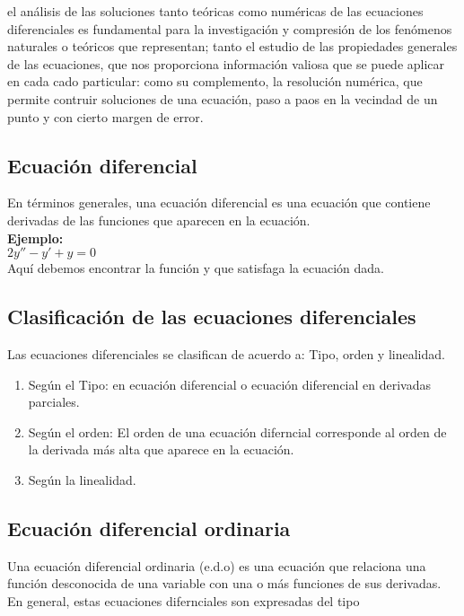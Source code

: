\documentclass{book}
\begin{document}
    el análisis de las soluciones tanto teóricas como numéricas de las ecuaciones
    diferenciales es fundamental para la investigación y compresión de los fenómenos naturales
    o teóricos que representan; tanto el estudio de las propiedades generales de las ecuaciones, que nos 
    proporciona información valiosa que se puede aplicar en cada cado particular: como su complemento, la resolución numérica,
    que permite contruir soluciones de una ecuación, paso a paos en la vecindad de un punto y con cierto margen de error.
    
    \subsection{Ecuación diferencial}
    En términos generales, una ecuación diferencial es una ecuación que 
    contiene derivadas de las funciones que aparecen en la ecuación.
    \\
    \textbf{Ejemplo:}
    \\
    $2y''-y'+y=0$
    \\ 
    Aquí debemos encontrar la función y que satisfaga la ecuación dada.
    
    \subsection{Clasificación de las ecuaciones diferenciales}
    Las ecuaciones diferenciales se clasifican de acuerdo a:
    Tipo, orden y linealidad.
    
    \begin{enumerate}
        \item Según el Tipo: en ecuación diferencial o ecuación diferencial en derivadas parciales.
        \item Según el orden: El orden de una ecuación diferncial corresponde al orden de la derivada más alta que aparece en la ecuación.
        \item Según la linealidad.
    \end{enumerate}

    \subsection{Ecuación diferencial ordinaria}
    Una ecuación diferencial ordinaria (e.d.o) es una ecuación que relaciona 
    una función desconocida de una variable con una o más funciones de sus derivadas.
    En general, estas ecuaciones difernciales son expresadas del tipo
\end{document}
